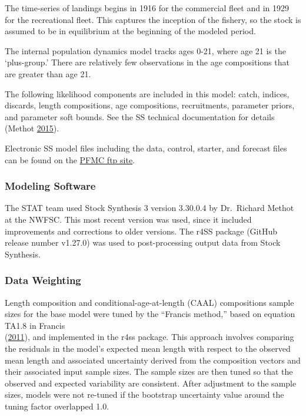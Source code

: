 \documentclass[12pt,]{article}
\begin{document}
The time-series of landings begins in 1916 for the commercial fleet and
in 1929 for the recreational fleet. This captures the inception of the
fishery, so the stock is assumed to be in equilibrium at the beginning
of the modeled period.

The internal population dynamics model tracks ages 0-21, where age 21 is
the `plus-group.' There are relatively few observations in the age
compositions that are greater than age 21.

The following likelihood components are included in this model: catch,
indices, discards, length compositions, age compositions, recruitments,
parameter priors, and parameter soft bounds. See the SS technical
documentation for details (Methot
\protect\hyperlink{ref-Methot2015}{2015}).

Electronic SS model files including the data, control, starter, and
forecast files can be found on the
\href{ftp://ftp.pcouncil.org/pub/GF_STAR3_2017_Blue_Deacon_CAScorp/}{PFMC
ftp site}.

\subsubsection{Modeling Software}\label{modeling-software}

The STAT team used Stock Synthesis 3 version 3.30.0.4 by Dr.~Richard
Methot at the NWFSC. This most recent version was used, since it
included improvements and corrections to older versions. The r4SS
package (GitHub release number v1.27.0) was used to post-processing
output data from Stock Synthesis.

\subsubsection{Data Weighting}\label{data-weighting}

Length composition and conditional-age-at-length (CAAL) compositions
sample sizes for the base model were tuned by the ``Francis method,''
based on equation TA1.8 in Francis\\
(\protect\hyperlink{ref-Francis2011}{2011}), and implemented in the r4ss
package. This approach involves comparing the residuals in the model's
expected mean length with respect to the observed mean length and
associated uncertainty derived from the composition vectors and their
associated input sample sizes. The sample sizes are then tuned so that
the observed and expected variability are consistent. After adjustment
to the sample sizes, models were not re-tuned if the bootstrap
uncertainty value around the tuning factor overlapped 1.0.
\end{document}
